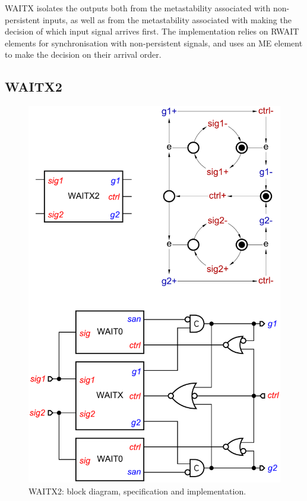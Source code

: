 \documentclass[conference]{IEEEtran}
\begin{document}
\textsf{WAITX} isolates the outputs
both from the metastability associated with non-persistent inputs, as well as from
the metastability associated with making the decision of which input signal arrives first.
The implementation relies on \textsf{RWAIT} elements for synchronisation with
non-persistent signals, and uses an \textsf{ME} element to make the decision on their
arrival order.

\subsection*{\textsf{WAITX2}}

\begin{figure}
\begin{center}
    \vspace{-2mm}
    \includegraphics[scale=0.23]{fig/WAITX2.pdf}
    \caption{\textsf{WAITX2}: block diagram, specification and implementation.}
    \label{fig:waitx2}
    \vspace{-5mm}
\end{center}
\end{figure}
\end{document}
